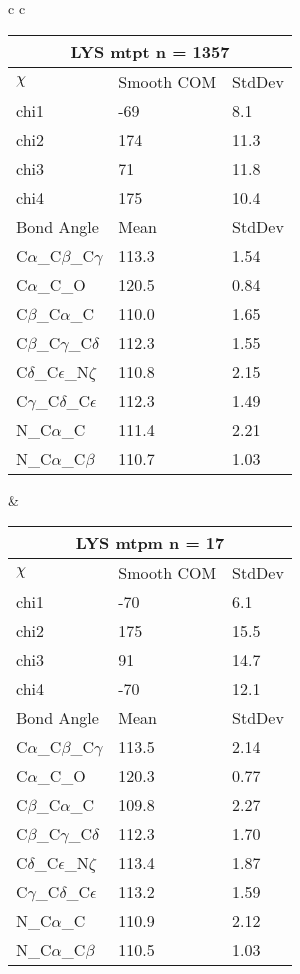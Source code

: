 \begin{longtable}{ c c }
  \begin{tabular}{ l l l }
  \toprule
  \multicolumn{3}{c}{LYS \textbf{mtpt} n = 1357} \\ \toprule
  $\chi$       & Smooth COM & StdDev \\ \midrule
  chi1 & -69 & 8.1 \\ 
  chi2 & 174 & 11.3 \\ 
  chi3 & 71 & 11.8 \\ 
  chi4 & 175 & 10.4 \\ \midrule
  Bond Angle   & Mean     & StdDev \\ \midrule
  C$\alpha$\_C$\beta$\_C$\gamma$ & 113.3 & 1.54\\
  C$\alpha$\_C\_O & 120.5 & 0.84\\
  C$\beta$\_C$\alpha$\_C & 110.0 & 1.65\\
  C$\beta$\_C$\gamma$\_C$\delta$ & 112.3 & 1.55\\
  C$\delta$\_C$\epsilon$\_N$\zeta$ & 110.8 & 2.15\\
  C$\gamma$\_C$\delta$\_C$\epsilon$ & 112.3 & 1.49\\
  N\_C$\alpha$\_C & 111.4 & 2.21\\
  N\_C$\alpha$\_C$\beta$ & 110.7 & 1.03\\
  \bottomrule
  \end{tabular}
  &
  \begin{tabular}{ l l l }
  \toprule
  \multicolumn{3}{c}{LYS \textbf{mtpm} n = 17} \\ \toprule
  $\chi$       & Smooth COM & StdDev \\ \midrule
  chi1 & -70 & 6.1 \\ 
  chi2 & 175 & 15.5 \\ 
  chi3 & 91 & 14.7 \\ 
  chi4 & -70 & 12.1 \\ \midrule
  Bond Angle   & Mean     & StdDev \\ \midrule
  C$\alpha$\_C$\beta$\_C$\gamma$ & 113.5 & 2.14\\
  C$\alpha$\_C\_O & 120.3 & 0.77\\
  C$\beta$\_C$\alpha$\_C & 109.8 & 2.27\\
  C$\beta$\_C$\gamma$\_C$\delta$ & 112.3 & 1.70\\
  C$\delta$\_C$\epsilon$\_N$\zeta$ & 113.4 & 1.87\\
  C$\gamma$\_C$\delta$\_C$\epsilon$ & 113.2 & 1.59\\
  N\_C$\alpha$\_C & 110.9 & 2.12\\
  N\_C$\alpha$\_C$\beta$ & 110.5 & 1.03\\

\end{tabular}
\end{longtable}
